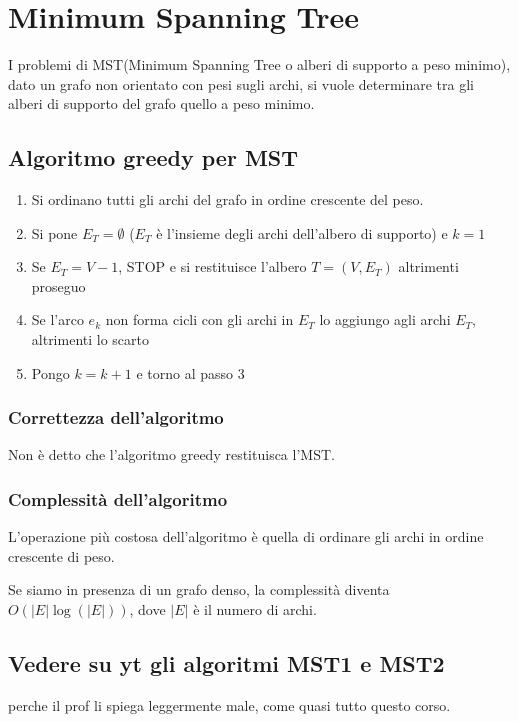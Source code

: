 
\chapter{Minimum Spanning Tree}


I problemi di MST(Minimum Spanning Tree o alberi di supporto a peso minimo), dato un grafo non orientato con pesi sugli archi, si vuole 
determinare tra gli alberi di supporto del grafo quello a peso minimo.

\section{Algoritmo greedy per MST}


\begin{enumerate}
  \item Si ordinano tutti gli archi del grafo in ordine crescente del peso.
  \item Si pone $E_T = \emptyset$ ($E_T$ è l'insieme degli archi dell'albero di supporto) e $k = 1$
  \item Se $E_T = V - 1$, STOP e si restituisce l'albero $T = (V, E_T)$ altrimenti proseguo
  \item Se l'arco $e_k$ non forma cicli con gli archi in $E_T$ lo aggiungo agli archi $E_T$, altrimenti lo scarto
  \item Pongo $k = k + 1$ e torno al passo 3
\end{enumerate}


\subsection{Correttezza dell'algoritmo}

Non è detto che l'algoritmo greedy restituisca l'MST.

\subsection{Complessità dell'algoritmo}

L'operazione più costosa dell'algoritmo è quella di ordinare gli archi in ordine crescente di peso.

Se siamo in presenza di un grafo denso, la complessità diventa $O(|E| \log(|E|))$, dove $|E|$ è il numero di archi.


\section{Vedere su yt gli algoritmi MST1 e MST2}
perche il prof li spiega leggermente male, come quasi tutto questo corso.



